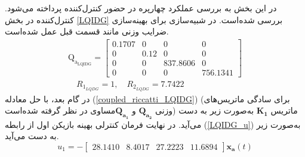 \documentclass{CCI2020}
\begin{document}
	
	در این بخش به بررسی عملکرد چهارپره در حضور کنترل‌کننده  پرداخته می‌شود. کنترل‌کننده  در بخش
	\ref{LQIDG}
	بررسی شده‌است.
	در شبیه‌سازی برای بهینه‌سازی ضرایب وزنی مانند قسمت قبل عمل شده‌است.
	\begin{equation}
		\begin{split}
					\boldsymbol{\mathrm{Q_{a_{\text{LQIDG}}}}} = \begin{bmatrix}
				0.1707 &0& 0& 0\\
				0 &  0.12 & 0 &0 \\
				0 & 0 & 837.8606 & 0\\
				0 & 0 & 0 & 756.1341
			\end{bmatrix}\\ \quad R_{1_{LQDG}} =  1, \quad R_{2_{LQDG}} =  7.7422
		\end{split}
	\end{equation}
	در گام بعد، با حل معادله
	(\ref{coupled_riccatti_LQIDG})
	(برای سادگی ماتریس‌های وزنی $\boldsymbol{{Q}_{a_2}}$ و $\boldsymbol{{Q}_{a_1}}$مساوی در نظر گرفته شده‌است)
	ماتریس
	$\boldsymbol{{K}_1}$
	به‌صورت زیر به دست می‌آید.
	در نهایت فرمان کنترلی بهینه بازیکن اول از رابطه
	(\ref{LQIDG_u})
	به‌صورت زیر به دست می‌آید.
	\begin{equation}
		u_1 = -\begin{bmatrix}
			28.1410 &   8.4017  & 27.2223  & 11.6894
		\end{bmatrix}\boldsymbol{x_{a}}(t)
	\end{equation}
	
\end{document}

